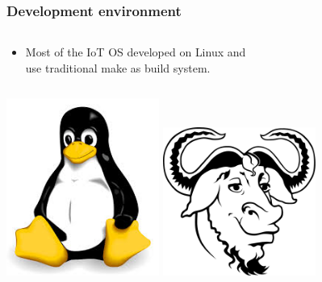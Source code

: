\documentclass{beamer}
\begin{document}
\begin{frame}
	\frametitle{Development environment}
	\begin{columns}[c]
		\begin{column}{30cm}
			\vspace{.1cm}
			\begin{itemize}
				\justifying
				\item Most of the IoT OS developed on \textcolor{TextOrange}{Linux} and\\
				use \textcolor{TextGreen}{traditional make} as build system.
			\end{itemize}
		\end{column}
	\end{columns}
	\vspace{.5cm}
	\hspace*{.5cm}
	\includegraphics[width=5cm]{figs/linux-logo.jpeg}
	\includegraphics[width=5cm]{figs/gun-logo.png}
\end{frame}
\end{document}

